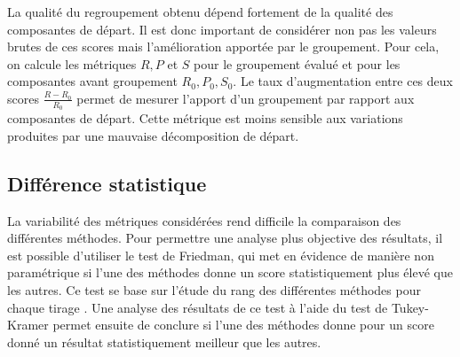 \documentclass{gretsi}
\begin{document}
    La qualité du regroupement obtenu dépend fortement de la qualité des composantes de départ. Il est donc important de considérer non pas les valeurs brutes de ces scores mais l'amélioration apportée par le groupement. Pour cela, on calcule les métriques $R, P$ et $S$ pour le groupement évalué et pour les composantes avant groupement $R_0, P_0, S_0$. Le taux d'augmentation entre ces deux scores $\frac{R-R_0}{R_0}$ permet de mesurer l'apport d'un groupement par rapport aux composantes de départ. Cette métrique est moins sensible aux variations produites par une mauvaise décomposition de départ.
    

\subsection{Différence statistique}
\label{sub:ds}

La variabilité des métriques considérées rend difficile la comparaison des différentes méthodes. Pour permettre une analyse plus objective des résultats, il est possible d'utiliser le test de Friedman, qui met en évidence de manière non paramétrique si l'une des méthodes donne un score statistiquement plus élevé que les autres. Ce test se base sur l'étude du rang des différentes méthodes pour chaque tirage \cite{friedman_37_rank}. Une analyse des résultats de ce test à l'aide du test de Tukey-Kramer permet ensuite de conclure si l'une des méthodes donne pour un score donné un résultat statistiquement meilleur que les autres.
    


    
       
\end{document}
